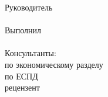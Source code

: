 \begin{flushright}
  \begin{minipage}[t]{.49\textwidth}
    \begin{minipage}[t]{.75\textwidth}
      \begin{flushright}
        Руководитель\\
        \hspace{0pt}\\
        Выполнил\\
        \hspace{0pt}\\
        Консультанты:\\
        по экономическому разделу\\
        по ЕСПД\\
        рецензент\\
      \end{flushright}
    \end{minipage}
  \end{minipage}
  \begin{minipage}[t]{.49\textwidth}
    \begin{flushright}
      \begin{minipage}[t]{.75\textwidth}
        \envDiplomTeacherInitials~\envDiplomTeacherSurname\\ %
        \hspace{0pt}\\
        \envDiplomStudentInitials~\envDiplomStudentSurname\\ %
        \hspace{0pt}\\
        \hspace{0pt}\\ %
        \envDiplomEconomicConsultantInitials~\envDiplomEconomicConsultantSurname\\ %
        \envDiplomEspdConsultantInitials~\envDiplomEspdConsultantSurname\\ %
        \envDiplomReviewerInitials~\envDiplomReviewerSurname\\ %
      \end{minipage}
    \end{flushright}
  \end{minipage}
\end{flushright}
